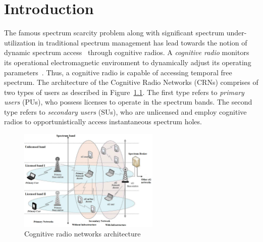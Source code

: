\chapter{Introduction}\label{intro}
The famous spectrum scarcity problem along with significant spectrum under-utilization in traditional spectrum management has lead towards the notion of dynamic spectrum access~\cite{akyildiz2006next} through cognitive radios. A \textit{cognitive radio} monitors its operational electromagnetic environment to dynamically adjust its operating parameters~\cite{Mitola}. Thus, a cognitive radio is capable of accessing temporal free spectrum. The architecture of the Cognitive Radio Networks (CRNs) comprises of two types of users as described in Figure~\ref{fig:cogArch}. The first type refers to \textit{primary users} (PUs), who possess licenses to operate in the spectrum bands. The second type refers to \textit{secondary users} (SUs), who are unlicensed and employ cognitive radios to opportunistically access instantaneous spectrum holes.

\begin{figure}[!htbp]
    \begin{center}
        \includegraphics[width=0.6\textwidth]{myFigures/cogArch.png}
        \caption{Cognitive radio networks architecture~\cite{bwnGatechProjectDescription}}
        \label{fig:cogArch}
    \end{center}
\end{figure}


